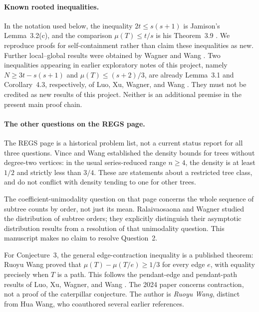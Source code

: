 \documentclass[11pt,letterpaper]{article}
\theoremstyle{plain}
\begin{document}
\paragraph{Known rooted inequalities.}
In the notation used below, the inequality $2t\le s(s+1)$ is Jamison's
Lemma~3.2(c), and the comparison $\mu(T)\le t/s$ is his Theorem~3.9
\cite{Jamison1983}. We reproduce proofs for self-containment rather than claim
these inequalities as new. Further local--global results were obtained by
Wagner and Wang \cite{WagnerWang2016}. Two inequalities appearing in earlier
exploratory notes of this project, namely $N\ge3t-s(s+1)$ and
$\mu(T)\le(s+2)/3$, are already Lemma~3.1 and Corollary~4.3, respectively, of
Luo, Xu, Wagner, and Wang \cite{LuoXuWagnerWang2023}. They must not be credited
as new results of this project. Neither is an additional premise in the
present main proof chain.

\paragraph{The other questions on the REGS page.}
The REGS page is a historical problem list, not a current status report for
all three questions. Vince and Wang \cite{VinceWang2010} established the
density bounds for trees without degree-two vertices: in the usual
series-reduced range $n\ge4$, the density is at least $1/2$ and strictly less
than $3/4$. These are statements about a restricted tree class, and do not
conflict with density tending to one for other trees.

The coefficient-unimodality question on that page concerns the whole sequence
of subtree counts by order, not just its mean. Ralaivaosaona and Wagner
\cite{RalaivaosaonaWagner2018} studied the distribution of subtree orders;
they explicitly distinguish their asymptotic distribution results from a
resolution of that unimodality question. This manuscript makes no claim to
resolve Question~2.

For Conjecture~3, the general edge-contraction inequality is a published theorem:
Ruoyu Wang \cite{RuoyuWang2024} proved that
$\mu(T)-\mu(T/e)\ge1/3$ for every edge $e$, with equality precisely when $T$
is a path. This follows the pendant-edge and pendant-path results of
Luo, Xu, Wagner, and Wang \cite{LuoXuWagnerWang2023}. The 2024 paper concerns
contraction, not a proof of the caterpillar conjecture. The author is
\emph{Ruoyu Wang}, distinct from Hua Wang, who coauthored several earlier
references.

\clearpage
\end{document}
